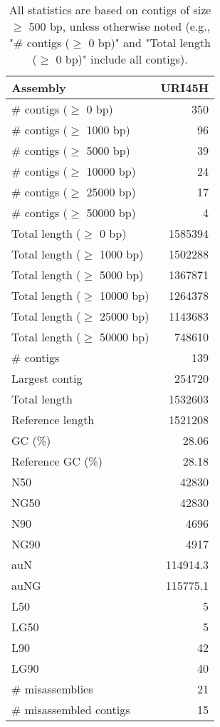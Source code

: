 \documentclass[12pt,a4paper]{article}
\begin{document}
\begin{table}[ht]
\begin{center}
\caption{All statistics are based on contigs of size $\geq$ 500 bp, unless otherwise noted (e.g., "\# contigs ($\geq$ 0 bp)" and "Total length ($\geq$ 0 bp)" include all contigs).}
\begin{tabular}{|l*{1}{|r}|}
\hline
Assembly & URI45H \\ \hline
\# contigs ($\geq$ 0 bp) & 350 \\ \hline
\# contigs ($\geq$ 1000 bp) & 96 \\ \hline
\# contigs ($\geq$ 5000 bp) & 39 \\ \hline
\# contigs ($\geq$ 10000 bp) & 24 \\ \hline
\# contigs ($\geq$ 25000 bp) & 17 \\ \hline
\# contigs ($\geq$ 50000 bp) & 4 \\ \hline
Total length ($\geq$ 0 bp) & 1585394 \\ \hline
Total length ($\geq$ 1000 bp) & 1502288 \\ \hline
Total length ($\geq$ 5000 bp) & 1367871 \\ \hline
Total length ($\geq$ 10000 bp) & 1264378 \\ \hline
Total length ($\geq$ 25000 bp) & 1143683 \\ \hline
Total length ($\geq$ 50000 bp) & 748610 \\ \hline
\# contigs & 139 \\ \hline
Largest contig & 254720 \\ \hline
Total length & 1532603 \\ \hline
Reference length & 1521208 \\ \hline
GC (\%) & 28.06 \\ \hline
Reference GC (\%) & 28.18 \\ \hline
N50 & 42830 \\ \hline
NG50 & 42830 \\ \hline
N90 & 4696 \\ \hline
NG90 & 4917 \\ \hline
auN & 114914.3 \\ \hline
auNG & 115775.1 \\ \hline
L50 & 5 \\ \hline
LG50 & 5 \\ \hline
L90 & 42 \\ \hline
LG90 & 40 \\ \hline
\# misassemblies & 21 \\ \hline
\# misassembled contigs & 15 \\ \hline

\end{tabular}
\end{center}
\end{table}
\end{document}
